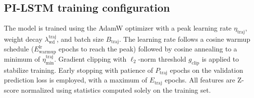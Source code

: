 \documentclass[a4paper,fleqn]{cas-dc}
\begin{document}
\subsection{PI-LSTM training configuration}

The model is trained using the AdamW optimizer \cite{loshchilov2019decoupled} with a peak learning rate $\eta_{\text{traj}}$, weight decay $\lambda_{\text{wd}}^{\text{traj}}$, and batch size $B_{\text{traj}}$. The learning rate follows a cosine warmup schedule ($E_{\text{warmup}}^{\text{lr}}$ epochs to reach the peak) followed by cosine annealing to a minimum of $\eta_{\min}^{\text{traj}}$. Gradient clipping with $\ell_2$-norm threshold $g_{\text{clip}}$ is applied to stabilize training. Early stopping with patience of $P_{\text{traj}}$ epochs on the validation prediction loss is employed, with a maximum of $E_{\text{traj}}$ epochs. All features are Z-score normalized using statistics computed solely on the training set.
\end{document}
